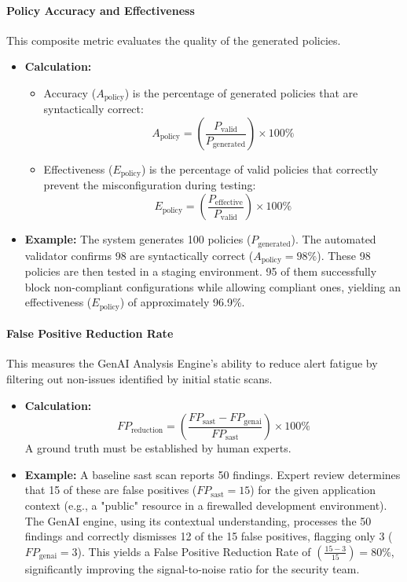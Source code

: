 \paragraph{Policy Accuracy and Effectiveness} This composite metric evaluates the quality of the generated policies.
\begin{itemize}
    \item \textbf{Calculation:}
        \begin{itemize}
            \item Accuracy (\( A_{\text{policy}} \)) is the percentage of generated policies that are syntactically correct:
            \[ A_{\text{policy}} = \left(\frac{P_{\text{valid}}}{P_{\text{generated}}}\right) \times 100\% \]
            \item Effectiveness (\( E_{\text{policy}} \)) is the percentage of valid policies that correctly prevent the misconfiguration during testing:
            \[ E_{\text{policy}} = \left(\frac{P_{\text{effective}}}{P_{\text{valid}}}\right) \times 100\% \]
        \end{itemize}
    \item \textbf{Example:} The system generates 100 policies (\( P_{\text{generated}} \)). The automated validator confirms 98 are syntactically correct (\( A_{\text{policy}} = 98\% \)). These 98 policies are then tested in a staging environment. 95 of them successfully block non-compliant configurations while allowing compliant ones, yielding an effectiveness (\( E_{\text{policy}} \)) of approximately 96.9\%.
\end{itemize}

\paragraph{False Positive Reduction Rate} This measures the GenAI Analysis Engine's ability to reduce alert fatigue by filtering out non-issues identified by initial static scans.
\begin{itemize}
    \item \textbf{Calculation:} \[ FP_{\text{reduction}} = \left(\frac{FP_{\text{sast}} - FP_{\text{genai}}}{FP_{\text{sast}}}\right) \times 100\% \] A ground truth must be established by human experts.
    \item \textbf{Example:} A baseline \gls{sast} scan reports 50 findings. Expert review determines that 15 of these are false positives (\( FP_{\text{sast}} = 15 \)) for the given application context (e.g., a "public" resource in a firewalled development environment). The GenAI engine, using its contextual understanding, processes the 50 findings and correctly dismisses 12 of the 15 false positives, flagging only 3 (\( FP_{\text{genai}} = 3 \)). This yields a False Positive Reduction Rate of \( \left(\frac{15 - 3}{15}\right) = 80\% \), significantly improving the signal-to-noise ratio for the security team.
\end{itemize}

